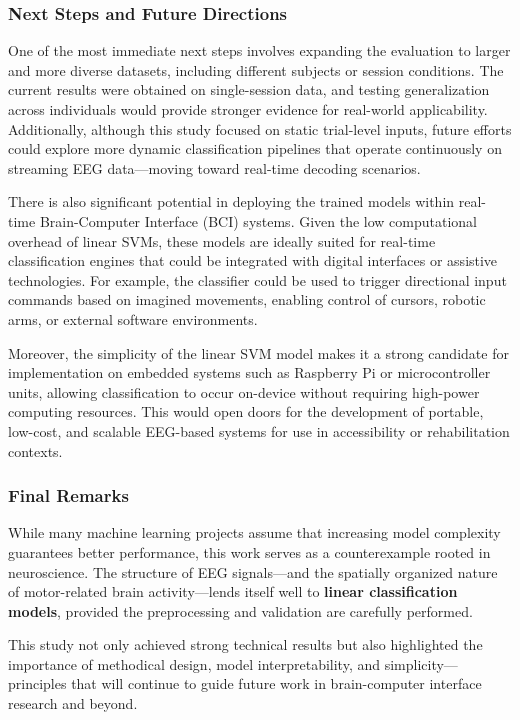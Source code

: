 \documentclass[
  letterpaper,
  DIV=11,
  numbers=noendperiod]{scrartcl}
\begin{document}
\subsubsection{Next Steps and Future
Directions}\label{next-steps-and-future-directions}

One of the most immediate next steps involves expanding the evaluation
to larger and more diverse datasets, including different subjects or
session conditions. The current results were obtained on single-session
data, and testing generalization across individuals would provide
stronger evidence for real-world applicability. Additionally, although
this study focused on static trial-level inputs, future efforts could
explore more dynamic classification pipelines that operate continuously
on streaming EEG data---moving toward real-time decoding scenarios.

There is also significant potential in deploying the trained models
within real-time Brain-Computer Interface (BCI) systems. Given the low
computational overhead of linear SVMs, these models are ideally suited
for real-time classification engines that could be integrated with
digital interfaces or assistive technologies. For example, the
classifier could be used to trigger directional input commands based on
imagined movements, enabling control of cursors, robotic arms, or
external software environments.

Moreover, the simplicity of the linear SVM model makes it a strong
candidate for implementation on embedded systems such as Raspberry Pi or
microcontroller units, allowing classification to occur on-device
without requiring high-power computing resources. This would open doors
for the development of portable, low-cost, and scalable EEG-based
systems for use in accessibility or rehabilitation contexts.

\subsubsection{Final Remarks}\label{final-remarks}

While many machine learning projects assume that increasing model
complexity guarantees better performance, this work serves as a
counterexample rooted in neuroscience. The structure of EEG
signals---and the spatially organized nature of motor-related brain
activity---lends itself well to \textbf{linear classification models},
provided the preprocessing and validation are carefully performed.

This study not only achieved strong technical results but also
highlighted the importance of methodical design, model interpretability,
and simplicity---principles that will continue to guide future work in
brain-computer interface research and beyond.
\end{document}
